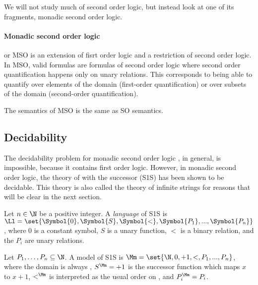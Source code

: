 We will not study much of second order logic, but instead
look at one of its fragments, monadic second order logic.

\paragraph*{Monadic second order logic} or MSO is an extension of
fisrt order logic and a restriction of second order logic.
In MSO, valid formulas are formulas of second order logic
where second order quantification happens only on unary relations.
This corresponds to being able to quantify over elements
of the domain (first-order quantification)
or over subsets of the domain (second-order quantification).

The semantics of MSO is the same as SO semantics.





\subsection{Decidability}


The decidability problem for monadic second order logic
, in general, is impossible, because it contains first order logic.
However, in monadic second order logic, the theory of \N with
the successor (S1S) has been shown to be decidable.
This theory is also called the theory of infinite strings
for reasons that will be clear in the next section.

\begin{definition}
    Let $n \in \N$ be a positive integer.
    A \emph{language}  of S1S is $\Ll = \set{\Symbol{0}, \Symbol{S}, \Symbol{<}, \Symbol{P_1}, ..., \Symbol{P_n}}$,
    where $0$ is a constant symbol, $S$ is a unary function,
    $<$ is a binary relation, and the $P_i$ are unary relations.

    Let $P_1, \dots, P_n \subseteq \N$. A model of S1S is
    $\Mm = \set{\N, 0, +1, <, P_1, ..., P_n}$,
    where the domain is always \N, $S^\Mm = +1$ is the successor function
    which maps $x$ to $x+1$, $<^\Mm$ is interpreted as the usual order
    on \N, and $P_i^\Mm = P_i$.

\end{definition}

